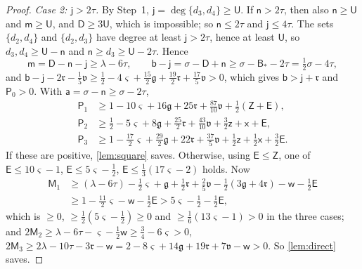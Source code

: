 \documentclass[11pt,colorlinks]{charlie}
\begin{document}
\begin{proof}
\emph{Case 2: $\mathsf j>2\tau$.} By Step~1, $\mathsf j=\deg\{d_3,d_4\}\ge\mathsf U$. If $\mathsf n>2\tau$, then also $\mathsf n\ge\mathsf U$ and $\mathsf m\ge\mathsf U$, and $\mathsf D\ge3\mathsf U$, which is impossible; so $\mathsf n\le2\tau$ and $\mathsf j\le4\tau$. The sets $\{d_2,d_4\}$ and $\{d_2,d_3\}$ have degree at least $\mathsf j>2\tau$, hence at least $\mathsf U$, so $d_3,d_4\ge\mathsf U-\mathsf n$ and $\mathsf n\ge d_3\ge\mathsf U-2\tau$. Hence
\[
 \mathsf m=\mathsf D-\mathsf n-\mathsf j\ge\lambda-6\tau,\qquad\mathsf b-\mathsf j=\sigma-\mathsf D+\mathsf n\ge\sigma-\mathsf B_*-2\tau=\tfrac12\sigma-4\tau,
\]
and $\mathsf b-\mathsf j-2\mathfrak r-\frac15\mathfrak v\ge\frac12-4\varsigma+\frac{15}2\mathfrak g+\frac{19}2\mathfrak r+\frac{17}5\mathfrak v>0$, which gives $\mathsf b>\mathsf j+\mathfrak r$ and $\mathsf P_0>0$. With $\mathsf a=\sigma-\mathsf n\ge\sigma-2\tau$,
\[
 \begin{aligned}
 \mathsf P_1&\ge1-10\varsigma+16\mathfrak g+25\mathfrak r+\tfrac{87}{10}\mathfrak v+\tfrac12(\mathsf Z+\mathsf E),\\
 \mathsf P_2&\ge\tfrac12-5\varsigma+8\mathfrak g+\tfrac{25}2\mathfrak r+\tfrac{43}{10}\mathfrak v+\tfrac32\mathsf z+\mathsf x+\mathsf E,\\
 \mathsf P_3&\ge1-\tfrac{17}2\varsigma+\tfrac{29}2\mathfrak g+22\mathfrak r+\tfrac{37}5\mathfrak v+\tfrac12\mathsf z+\tfrac12\mathsf x+\tfrac32\mathsf E .
 \end{aligned}
\]
If these are positive, \cref{lem:square} saves. Otherwise, using $\mathsf E\le\mathsf Z$, one of $\mathsf E\le10\varsigma-1$, $\mathsf E\le5\varsigma-\frac12$, $\mathsf E\le\frac13(17\varsigma-2)$ holds. Now
\[
 \begin{aligned}
 \mathsf M_1&\ge(\lambda-6\tau)-\tfrac12\varsigma+\mathfrak g+\tfrac12\mathfrak r+\tfrac25\mathfrak v-\tfrac12(3\mathfrak g+4\mathfrak r)-\mathsf w-\tfrac12\mathsf E\\
 &\ge1-\tfrac{11}2\varsigma-\mathsf w-\tfrac12\mathsf E>5\varsigma-\tfrac12-\tfrac12\mathsf E,
 \end{aligned}
\]
which is $\ge0$, $\ge\frac12(5\varsigma-\frac12)\ge0$ and $\ge\frac16(13\varsigma-1)>0$ in the three cases; and $2\mathsf M_2\ge\lambda-6\tau-\varsigma-\frac12\mathsf w\ge\frac34-6\varsigma>0$, $2\mathsf M_3\ge2\lambda-10\tau-3\mathfrak r-\mathsf w=2-8\varsigma+14\mathfrak g+19\mathfrak r+7\mathfrak v-\mathsf w>0$. So \cref{lem:direct} saves.


\end{proof}
\end{document}

